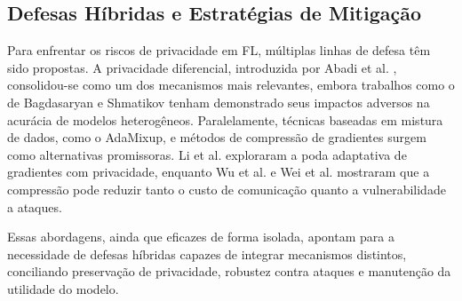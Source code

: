 \documentclass[
	12pt,				%
	openright,			%
	oneside,			%
	a4paper,			%
	english,			%
	french,				%
	spanish,			%
	brazil,				%
	]{abntex2}
\begin{document}
\subsection{Defesas Híbridas e Estratégias de Mitigação}
\label{subsec:defesas_hibridas}

Para enfrentar os riscos de privacidade em FL, múltiplas linhas de defesa têm sido propostas. A privacidade diferencial, introduzida por Abadi et al. \cite{abadi2016dpsgd}, consolidou-se como um dos mecanismos mais relevantes, embora trabalhos como o de Bagdasaryan e Shmatikov \cite{bagdasaryan2019dpimpact} tenham demonstrado seus impactos adversos na acurácia de modelos heterogêneos. Paralelamente, técnicas baseadas em mistura de dados, como o AdaMixup, e métodos de compressão de gradientes surgem como alternativas promissoras. Li et al. \cite{li2023gradientpruning} exploraram a poda adaptativa de gradientes com privacidade, enquanto Wu et al. \cite{wu2023pruningfl} e Wei et al. \cite{wei2024gradientsparsification} mostraram que a compressão pode reduzir tanto o custo de comunicação quanto a vulnerabilidade a ataques. 

Essas abordagens, ainda que eficazes de forma isolada, apontam para a necessidade de defesas híbridas capazes de integrar mecanismos distintos, conciliando preservação de privacidade, robustez contra ataques e manutenção da utilidade do modelo.
\end{document}
